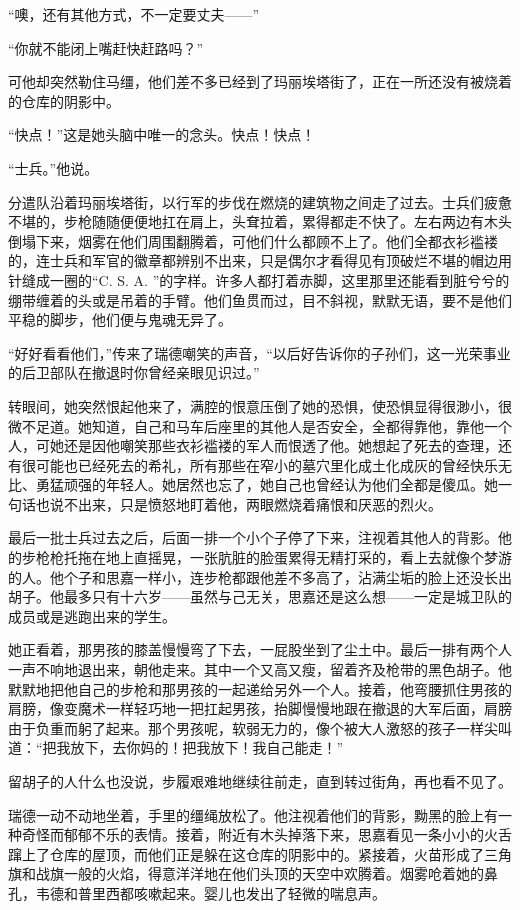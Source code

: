 \par “噢，还有其他方式，不一定要丈夫——”
\par “你就不能闭上嘴赶快赶路吗？”
\par 可他却突然勒住马缰，他们差不多已经到了玛丽埃塔街了，正在一所还没有被烧着的仓库的阴影中。
\par “快点！”这是她头脑中唯一的念头。快点！快点！
\par “士兵。”他说。
\par 分遣队沿着玛丽埃塔街，以行军的步伐在燃烧的建筑物之间走了过去。士兵们疲惫不堪的，步枪随随便便地扛在肩上，头耷拉着，累得都走不快了。左右两边有木头倒塌下来，烟雾在他们周围翻腾着，可他们什么都顾不上了。他们全都衣衫褴褛的，连士兵和军官的徽章都辨别不出来，只是偶尔才看得见有顶破烂不堪的帽边用针缝成一圈的“C. S. A. ”的字样。许多人都打着赤脚，这里那里还能看到脏兮兮的绷带缠着的头或是吊着的手臂。他们鱼贯而过，目不斜视，默默无语，要不是他们平稳的脚步，他们便与鬼魂无异了。
\par “好好看看他们，”传来了瑞德嘲笑的声音，“以后好告诉你的子孙们，这一光荣事业的后卫部队在撤退时你曾经亲眼见识过。”
\par 转眼间，她突然恨起他来了，满腔的恨意压倒了她的恐惧，使恐惧显得很渺小，很微不足道。她知道，自己和马车后座里的其他人是否安全，全都得靠他，靠他一个人，可她还是因他嘲笑那些衣衫褴褛的军人而恨透了他。她想起了死去的查理，还有很可能也已经死去的希礼，所有那些在窄小的墓穴里化成土化成灰的曾经快乐无比、勇猛顽强的年轻人。她居然也忘了，她自己也曾经认为他们全都是傻瓜。她一句话也说不出来，只是愤怒地盯着他，两眼燃烧着痛恨和厌恶的烈火。
\par 最后一批士兵过去之后，后面一排一个小个子停了下来，注视着其他人的背影。他的步枪枪托拖在地上直摇晃，一张肮脏的脸蛋累得无精打采的，看上去就像个梦游的人。他个子和思嘉一样小，连步枪都跟他差不多高了，沾满尘垢的脸上还没长出胡子。他最多只有十六岁——虽然与己无关，思嘉还是这么想——一定是城卫队的成员或是逃跑出来的学生。
\par 她正看着，那男孩的膝盖慢慢弯了下去，一屁股坐到了尘土中。最后一排有两个人一声不响地退出来，朝他走来。其中一个又高又瘦，留着齐及枪带的黑色胡子。他默默地把他自己的步枪和那男孩的一起递给另外一个人。接着，他弯腰抓住男孩的肩膀，像变魔术一样轻巧地一把扛起男孩，抬脚慢慢地跟在撤退的大军后面，肩膀由于负重而躬了起来。那个男孩呢，软弱无力的，像个被大人激怒的孩子一样尖叫道：“把我放下，去你妈的！把我放下！我自己能走！”
\par 留胡子的人什么也没说，步履艰难地继续往前走，直到转过街角，再也看不见了。
\par 瑞德一动不动地坐着，手里的缰绳放松了。他注视着他们的背影，黝黑的脸上有一种奇怪而郁郁不乐的表情。接着，附近有木头掉落下来，思嘉看见一条小小的火舌蹿上了仓库的屋顶，而他们正是躲在这仓库的阴影中的。紧接着，火苗形成了三角旗和战旗一般的火焰，得意洋洋地在他们头顶的天空中欢腾着。烟雾呛着她的鼻孔，韦德和普里西都咳嗽起来。婴儿也发出了轻微的喘息声。
